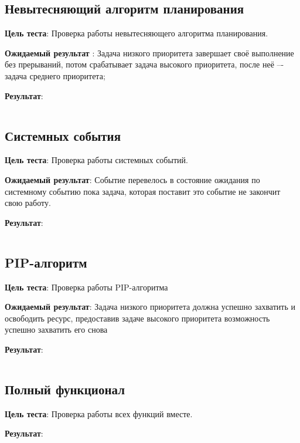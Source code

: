 \subsection{Невытесняющий алгоритм планирования}

\noindent
\textbf{Цель теста}: Проверка работы невытесняющего алгоритма планирования.

\noindent
\textbf{Ожидаемый результат }: Задача низкого приоритета завершает своё выполнение без
прерываний, потом срабатывает задача высокого приоритета, после неё –- задача среднего
приоритета;

\noindent
\textbf{Результат}: 
\inputminted[linenos=false]{text}{results/test1.txt}

\subsection{Системных события}

\noindent
\textbf{Цель теста}: Проверка работы системных событий.

\noindent
\textbf{Ожидаемый результат}: Событие перевелось в состояние ожидания по системному событию пока задача, которая
поставит это событие не закончит свою работу.

\noindent
\textbf{Результат}: 
\inputminted[linenos=false]{text}{results/test2.txt}
\subsection{PIP-алгоритм}

\noindent
\textbf{Цель теста}: Проверка работы PIP-алгоритма

\noindent
\textbf{Ожидаемый результат}: Задача низкого приоритета должна успешно захватить и освободить
ресурс, предоставив задаче высокого приоритета возможность успешно захватить
его снова

\noindent
\textbf{Результат}: 
\inputminted[linenos=false]{text}{results/test3.txt}
\subsection{Полный функционал}

\noindent
\textbf{Цель теста}: Проверка работы всех функций вместе.

\noindent
\textbf{Результат}: 
\inputminted[linenos=false]{text}{results/test4.txt}